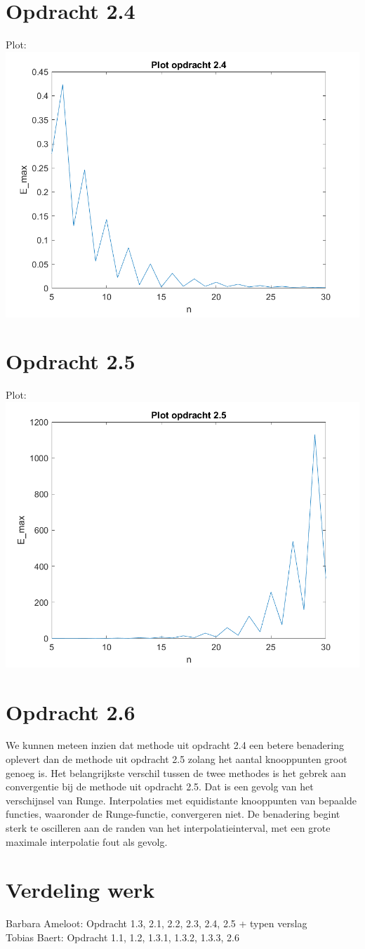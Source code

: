 \documentclass[a4paper]{article}
\begin{document}
\section*{Opdracht 2.4}
Plot:
\\{}
\includegraphics[scale = 0.8]{plot2_4}
%
%
%
%
%
%
\section*{Opdracht 2.5}
Plot:
\\{}
\includegraphics[scale = 0.8]{plot2_5}
%
%
%
%
%
%
\section*{Opdracht 2.6}
We kunnen meteen inzien dat methode uit opdracht 2.4 een betere benadering oplevert dan de  methode uit opdracht 2.5 zolang het aantal knooppunten groot genoeg is. Het belangrijkste verschil tussen de twee methodes is het gebrek aan convergentie bij de methode uit opdracht 2.5. Dat is een gevolg van het verschijnsel van Runge. Interpolaties met equidistante knooppunten van bepaalde functies, waaronder de Runge-functie, convergeren niet. De benadering begint sterk te oscilleren aan de randen van het interpolatieinterval, met een grote maximale interpolatie fout als gevolg.
\section*{Verdeling werk}
Barbara Ameloot: Opdracht 1.3, 2.1, 2.2, 2.3, 2.4, 2.5 + typen verslag
\\Tobias Baert: Opdracht 1.1, 1.2, 1.3.1, 1.3.2, 1.3.3, 2.6
\end{document}
